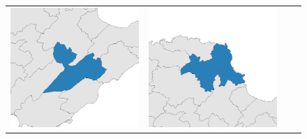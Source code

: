 \begin{figure}[p]
\begin{tabularx}{1\textwidth}{XXXX}
\includegraphics[width=1\linewidth]{images/ch6/mergefocus/11}&
\includegraphics[width=1\linewidth]{images/ch6/mergefocus/12} \\

\end{tabularx}
\end{figure}
